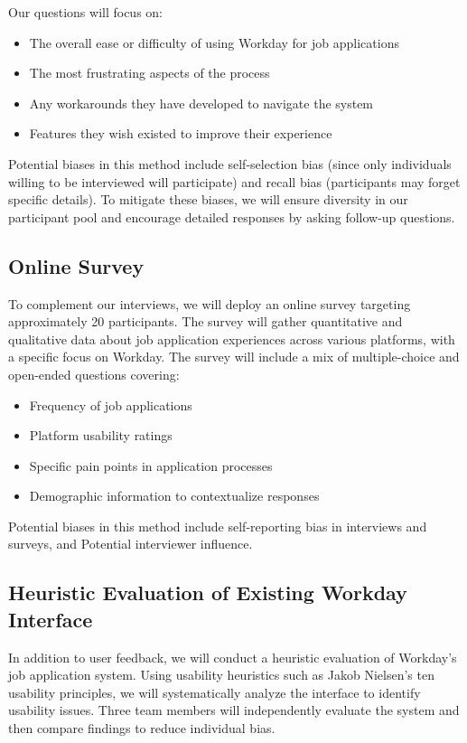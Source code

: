\documentclass[
	letterpaper, %
]{jdf}
\begin{document}
\begin{sloppypar}
Our questions will focus on:
\begin{itemize}
    \item The overall ease or difficulty of using Workday for job applications
    \item The most frustrating aspects of the process
    \item Any workarounds they have developed to navigate the system
    \item Features they wish existed to improve their experience
\end{itemize}

Potential biases in this method include self-selection bias (since only individuals willing to be interviewed will participate) and recall bias (participants may forget specific details). To mitigate these biases, we will ensure diversity in our participant pool and encourage detailed responses by asking follow-up questions.
\hfill \break

\subsection {Online Survey}
To complement our interviews, we will deploy an online survey targeting approximately 20 participants. The survey will gather quantitative and qualitative data about job application experiences across various platforms, with a specific focus on Workday.
The survey will include a mix of multiple-choice and open-ended questions covering:
\begin{itemize}
    \item Frequency of job applications
    \item Platform usability ratings
    \item Specific pain points in application processes
    \item Demographic information to contextualize responses
\end{itemize}

Potential biases in this method include self-reporting bias in interviews and surveys, and Potential interviewer influence. 

\hfill \break
\subsection{Heuristic Evaluation of Existing Workday Interface}
In addition to user feedback, we will conduct a heuristic evaluation of Workday’s job application system. Using usability heuristics such as Jakob Nielsen’s ten usability principles, we will systematically analyze the interface to identify usability issues. Three team members will independently evaluate the system and then compare findings to reduce individual bias.


\end{sloppypar}
\end{document}
